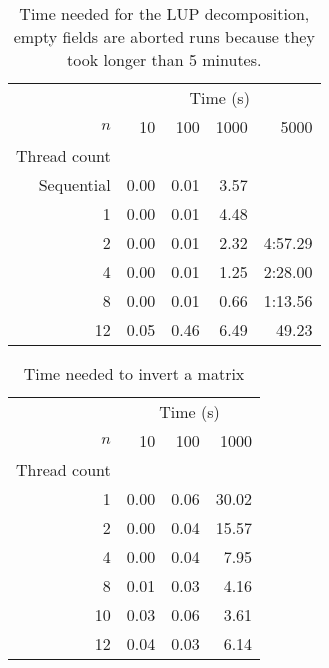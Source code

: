 \documentclass[a4paper]{article}
\begin{document}
\begin{table}
	\centering
	\caption{Time needed for the LUP decomposition, empty fields are aborted runs because they took longer than 5 minutes.}
	\label{tbl:lup}
	\begin{tabular}{r|r|r|r|r}
		& \multicolumn{4}{c}{Time (s)} \\
		$n$ & 10 & 100 & 1000 & 5000 \\ \hline
		Thread count \\ \cline{2-5}
		Sequential & 0.00  & 0.01 & 3.57 & \\
		 1 & 0.00 & 0.01 & 4.48 &  \\
		 2 & 0.00 & 0.01 & 2.32 & 4:57.29 \\
		 4 & 0.00 & 0.01 & 1.25 & 2:28.00 \\
		 8 & 0.00 & 0.01 & 0.66 & 1:13.56 \\
		12 & 0.05 & 0.46 & 6.49 & 49.23 \\
	\end{tabular}
\end{table}

\begin{table}
	\centering
	\caption{Time needed to invert a matrix}
	\label{tbl:invert}
	\begin{tabular}{r|r|r|r}
		& \multicolumn{3}{c}{Time (s)} \\
		$n$ & 10 & 100 & 1000 \\ \hline
		Thread count \\ \cline{2-4}
		 1 & 0.00 & 0.06 & 30.02 \\
		 2 & 0.00 & 0.04 & 15.57 \\
		 4 & 0.00 & 0.04 & 7.95 \\
		 8 & 0.01 & 0.03 & 4.16 \\
		10 & 0.03 & 0.06 & 3.61 \\
		12 & 0.04 & 0.03 & 6.14 \\
	\end{tabular}
\end{table}
\end{document}
